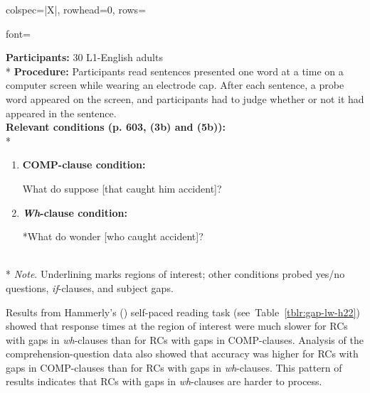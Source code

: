 \begin{longtblr}[caption={\textcite{kluender.kutas1993}: ERP task (Experiment 3)}, label={tblr:gap-lw-kk93}]{colspec={|X|}, rowhead=0, rows={font=\raggedright{}}}\hline
\textbf{Participants:} 30 L1-English adults \vspace{5pt}\\*
\textbf{Procedure:} Participants read sentences presented one word at a time on a computer screen while wearing an electrode cap. After each sentence, a probe word appeared on the screen, and participants had to judge whether or not it had appeared in the sentence. \vspace{5pt}\\
\textbf{Relevant conditions (p. 603, (3b) and (5b)):} \vspace{5pt}\\*
\begin{varwidth}{\linewidth}\begin{enumerate}[\bfseries (a),itemsep=5pt] 
\item \textbf{COMP-clause condition:}\par\nobreak\vspace{3pt}
What do  suppose [that  caught him   accident]?
\item \textbf{\textit{Wh}-clause condition:}\par\nobreak\vspace{3pt}
*What do  wonder [who  caught   accident]?
\end{enumerate}\end{varwidth}\vspace{5pt}\\*
\textit{Note}. Underlining marks regions of interest; other conditions probed yes/no questions, \textit{if}-clauses, and subject gaps. \\\hline
\end{longtblr}

Results from Hammerly's (\citeyear{hammerly2022}) self-paced reading task (see~Table~\ref{tblr:gap-lw-h22}) showed that response times at the region of interest were much slower for RCs with gaps in \textit{wh}-clauses than for RCs with gaps in COMP-clauses. Analysis of the comprehension-question data also showed that accuracy was higher for RCs with gaps in COMP-clauses than for RCs with gaps in \textit{wh}-clauses. This pattern of results indicates that RCs with gaps in \textit{wh}-clauses are harder to process.

